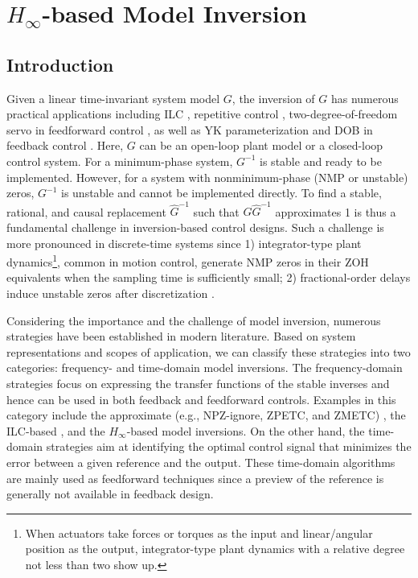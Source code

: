 \documentclass [11pt, proquest] {uwthesis}[2020/02/24]
\begin{document}

\chapter{$H_\infty$-based Model Inversion} \label{chap:Model-Inversion}

\section{Introduction} \label{sec: Model-inversion-Introduction}

Given a linear time-invariant system model $G$, the inversion of
$G$ has numerous practical applications including ILC \cite{Bristow2006,shen2018iterative,de2019data}, repetitive
control \cite{wang2018multirate,zhu2017observer}, two-degree-of-freedom
servo in feedforward control \cite{Tomizuka1999,wang2016robust},
as well as YK parameterization and DOB in feedback
control \cite{jiang2019local,Ohnishi1993,chen2011minimum,apte2019disturbance,wang2017tutorial}.
Here, $G$ can be an open-loop plant model or a closed-loop control
system. For a minimum-phase system, $G^{-1}$ is stable and ready
to be implemented. However, for a system with nonminimum-phase (NMP
or unstable) zeros, $G^{-1}$ is unstable and cannot be implemented
directly. To find a stable, rational, and causal replacement $\hat{G}^{-1}$
such that $G\hat{G}^{-1}$ approximates 1 is thus a fundamental challenge
in inversion-based control designs. Such a challenge is more pronounced
in discrete-time systems since 1) integrator-type plant dynamics\footnote{When actuators take forces or torques as the input and linear/angular
position as the output, integrator-type plant dynamics with a relative
degree not less than two show up.}, common in motion control, generate NMP zeros in their ZOH equivalents when the sampling time is sufficiently small; 2)
fractional-order delays induce unstable zeros after discretization
\cite{Astrom1984_zerosOfSampledSys}.

Considering the importance and the challenge of model inversion,
numerous strategies have been established in modern literature. Based
on system representations and scopes of application, we can classify
these strategies into two categories: frequency- and time-domain model
inversions. The frequency-domain strategies focus on expressing the
transfer functions of the stable inverses and hence can be used in
both feedback and feedforward controls. Examples in this category
include the approximate (e.g., NPZ-ignore, ZPETC, and ZMETC) \cite{Tomizuka1987,dai2019quantitative,butterworth_analysis_2012,Butterworth2008},
the ILC-based \cite{devasia2017iterative,kim_modelingfree_2013,chen2016data},
and the $H_{\infty}$-based \cite{zheng2018systematic,francis_h_1984,zheng2017design}
model inversions. On the other hand, the time-domain strategies \cite{de2019finite,dewey1998experimental,Ramani:2017hx,van2018inversion}
aim at identifying the optimal control signal that minimizes the error
between a given reference and the output. These time-domain algorithms
are mainly used as feedforward techniques since a preview of the reference
is generally not available in feedback design.
\end{document}
